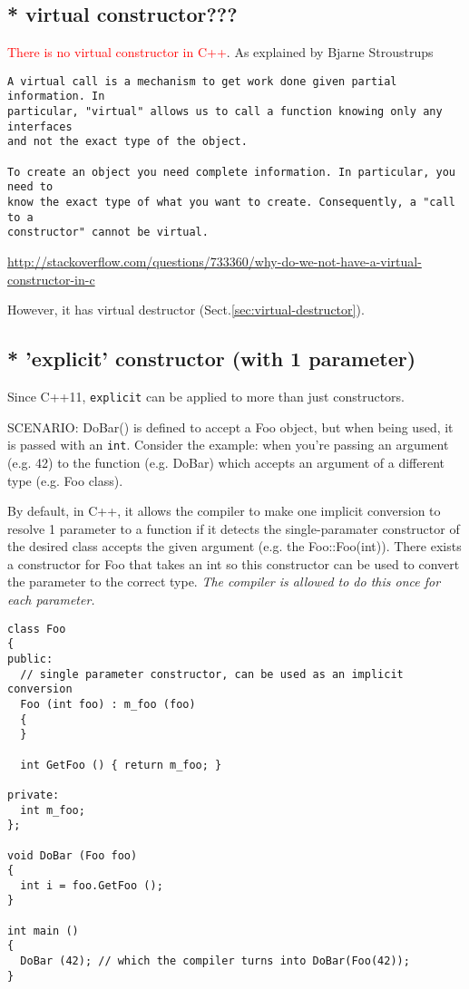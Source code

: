   
\subsection{* virtual constructor???}
\label{sec:virtual-constructor}

\textcolor{red}{There is no virtual constructor in C++}.
As explained by Bjarne Stroustrups
\begin{verbatim}
A virtual call is a mechanism to get work done given partial information. In
particular, "virtual" allows us to call a function knowing only any interfaces
and not the exact type of the object.

To create an object you need complete information. In particular, you need to
know the exact type of what you want to create. Consequently, a "call to a
constructor" cannot be virtual.
\end{verbatim}
\url{http://stackoverflow.com/questions/733360/why-do-we-not-have-a-virtual-constructor-in-c}

However, it has virtual destructor (Sect.\ref{sec:virtual-destructor}).

\subsection{* 'explicit' constructor (with 1 parameter)}
\label{sec:explicit-keyword}

Since C++11, \verb!explicit! can be applied to more than just constructors. 

SCENARIO: DoBar() is defined to accept a Foo object, but when being used, it is
passed with an \verb!int!.  Consider the example: when you're passing an
argument (e.g. 42) to the function (e.g. DoBar) which accepts an argument of a
different type (e.g. Foo class).


By default, in C++, it allows the compiler to make one implicit conversion to
resolve 1 parameter to a function if it detects the single-paramater constructor
of the desired class accepts the given argument (e.g. the Foo::Foo(int)).
There exists a constructor for Foo that takes an int so this constructor can be
used to convert the parameter to the correct type.
{\it The compiler is allowed to do this once for each parameter.}


\begin{lstlisting}
class Foo
{
public:
  // single parameter constructor, can be used as an implicit conversion
  Foo (int foo) : m_foo (foo) 
  {
  }

  int GetFoo () { return m_foo; }

private:
  int m_foo;
};

void DoBar (Foo foo)
{
  int i = foo.GetFoo ();
}

int main ()
{
  DoBar (42); // which the compiler turns into DoBar(Foo(42));
}
\end{lstlisting}

